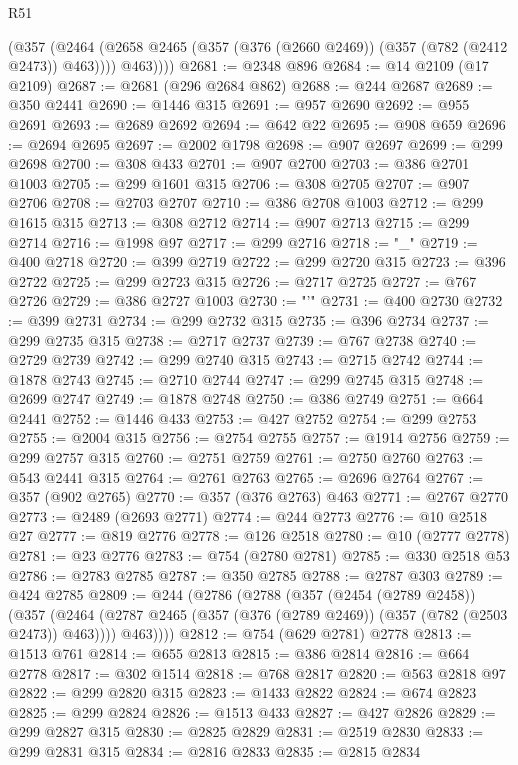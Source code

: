 \begin{lexlean}{R51}
\begin{coremodule}
          (@357
            (@2464 (@2658 @2465 (@357 (@376 (@2660 @2469)) (@357 (@782 (@2412 @2473)) @463))))
            @463))))
@2681 := @2348 @896
@2684 := @14 @2109 (@17 @2109)
@2687 := @2681 (@296 @2684 @862)
@2688 := @244 @2687
@2689 := @350 @2441
@2690 := @1446 @315
@2691 := @957 @2690
@2692 := @955 @2691
@2693 := @2689 @2692
@2694 := @642 @22
@2695 := @908 @659
@2696 := @2694 @2695
@2697 := @2002 @1798
@2698 := @907 @2697
@2699 := @299 @2698
@2700 := @308 @433
@2701 := @907 @2700
@2703 := @386 @2701 @1003
@2705 := @299 @1601 @315
@2706 := @308 @2705
@2707 := @907 @2706
@2708 := @2703 @2707
@2710 := @386 @2708 @1003
@2712 := @299 @1615 @315
@2713 := @308 @2712
@2714 := @907 @2713
@2715 := @299 @2714
@2716 := @1998 @97
@2717 := @299 @2716
@2718 := "_"
@2719 := @400 @2718
@2720 := @399 @2719
@2722 := @299 @2720 @315
@2723 := @396 @2722
@2725 := @299 @2723 @315
@2726 := @2717 @2725
@2727 := @767 @2726
@2729 := @386 @2727 @1003
@2730 := "'"
@2731 := @400 @2730
@2732 := @399 @2731
@2734 := @299 @2732 @315
@2735 := @396 @2734
@2737 := @299 @2735 @315
@2738 := @2717 @2737
@2739 := @767 @2738
@2740 := @2729 @2739
@2742 := @299 @2740 @315
@2743 := @2715 @2742
@2744 := @1878 @2743
@2745 := @2710 @2744
@2747 := @299 @2745 @315
@2748 := @2699 @2747
@2749 := @1878 @2748
@2750 := @386 @2749
@2751 := @664 @2441
@2752 := @1446 @433
@2753 := @427 @2752
@2754 := @299 @2753
@2755 := @2004 @315
@2756 := @2754 @2755
@2757 := @1914 @2756
@2759 := @299 @2757 @315
@2760 := @2751 @2759
@2761 := @2750 @2760
@2763 := @543 @2441 @315
@2764 := @2761 @2763
@2765 := @2696 @2764
@2767 := @357 (@902 @2765)
@2770 := @357 (@376 @2763) @463
@2771 := @2767 @2770
@2773 := @2489 (@2693 @2771)
@2774 := @244 @2773
@2776 := @10 @2518 @27
@2777 := @819 @2776
@2778 := @126 @2518
@2780 := @10 (@2777 @2778)
@2781 := @23 @2776
@2783 := @754 (@2780 @2781)
@2785 := @330 @2518 @53
@2786 := @2783 @2785
@2787 := @350 @2785
@2788 := @2787 @303
@2789 := @424 @2785
@2809 := @244
    (@2786
      (@2788
        (@357
          (@2454 (@2789 @2458))
          (@357
            (@2464 (@2787 @2465 (@357 (@376 (@2789 @2469)) (@357 (@782 (@2503 @2473)) @463))))
            @463))))
@2812 := @754 (@629 @2781) @2778
@2813 := @1513 @761
@2814 := @655 @2813
@2815 := @386 @2814
@2816 := @664 @2778
@2817 := @302 @1514
@2818 := @768 @2817
@2820 := @563 @2818 @97
@2822 := @299 @2820 @315
@2823 := @1433 @2822
@2824 := @674 @2823
@2825 := @299 @2824
@2826 := @1513 @433
@2827 := @427 @2826
@2829 := @299 @2827 @315
@2830 := @2825 @2829
@2831 := @2519 @2830
@2833 := @299 @2831 @315
@2834 := @2816 @2833
@2835 := @2815 @2834

\end{coremodule}
\end{lexlean}
